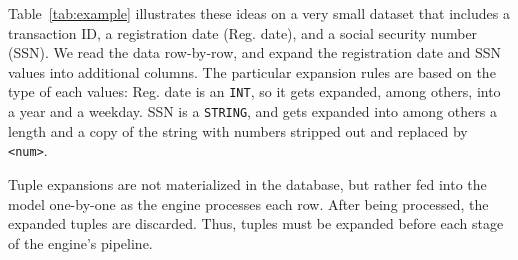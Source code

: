 Table~\ref{tab:example} illustrates these ideas on a very small dataset that includes a transaction ID, a registration date (Reg. date), and a social security number (SSN). We read the data row-by-row, and expand the registration date and SSN values into additional columns. The particular expansion rules are based on the type of each values: Reg. date is an \texttt{INT}, so it gets expanded, among others, into a year and a weekday. SSN is a \texttt{STRING}, and gets expanded into among others a length and a copy of the string with numbers stripped out and replaced by \texttt{<num>}.

Tuple expansions are not materialized in the database, but rather fed into the model one-by-one as the engine processes each row.
After being processed, the expanded tuples are discarded.
Thus, tuples must be expanded before each stage of the engine's pipeline.


\newcommand*{\boldtt}[1]{\fontfamily{pcr}\selectfont #1}

